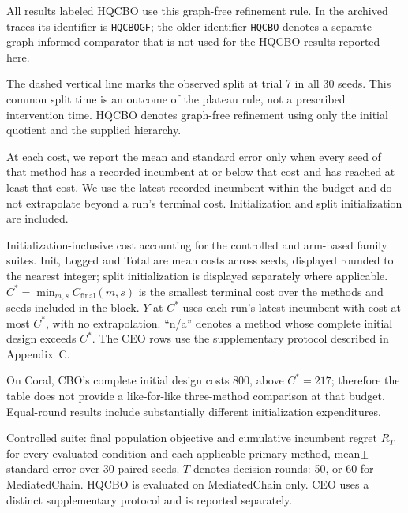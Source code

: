 All results labeled HQCBO use this graph-free refinement rule. In the archived
traces its identifier is \texttt{HQCBOGF}; the older identifier \texttt{HQCBO}
denotes a separate graph-informed comparator that is not used for the HQCBO
results reported here.

The dashed vertical line marks the observed split at trial 7 in all 30 seeds.
This common split time is an outcome of the plateau rule, not a prescribed
intervention time. HQCBO denotes graph-free refinement using only the initial
quotient and the supplied hierarchy.

At each cost, we report the mean and standard error only when every seed of
that method has a recorded incumbent at or below that cost and has reached
at least that cost. We use the latest recorded incumbent within the budget
and do not extrapolate beyond a run's terminal cost. Initialization and split
initialization are included.

Initialization-inclusive cost accounting for the controlled and arm-based
family suites. Init, Logged and Total are mean costs across seeds, displayed
rounded to the nearest integer; split initialization is displayed separately
where applicable. $C^\ast=\min_{m,s}C_{\mathrm{final}}(m,s)$ is the smallest
terminal cost over the methods and seeds included in the block. $Y$ at
$C^\ast$ uses each run's latest incumbent with cost at most $C^\ast$, with no
extrapolation. ``n/a'' denotes a method whose complete initial design exceeds
$C^\ast$. The CEO rows use the supplementary protocol described in Appendix~C.

On Coral, CBO's complete initial design costs 800, above $C^\ast=217$;
therefore the table does not provide a like-for-like three-method comparison
at that budget. Equal-round results include substantially different
initialization expenditures.

Controlled suite: final population objective and cumulative incumbent regret
$R_T$ for every evaluated condition and each applicable primary method,
mean$\pm$standard error over 30 paired seeds. $T$ denotes decision rounds:
50, or 60 for MediatedChain. HQCBO is evaluated on MediatedChain only.
CEO uses a distinct supplementary protocol and is reported separately.

